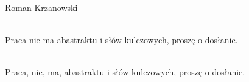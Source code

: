 \begin{newrevengenv}{Roman Krzanowski}



\vspace{15mm}%
{}\\
{Praca nie ma abastraktu i słów kulczowych, proszę o dosłanie.}\par%
\vspace{2mm}%
{}\\
{Praca, nie, ma, abastraktu i słów kulczowych, proszę o dosłanie.}%



\end{newrevengenv}

